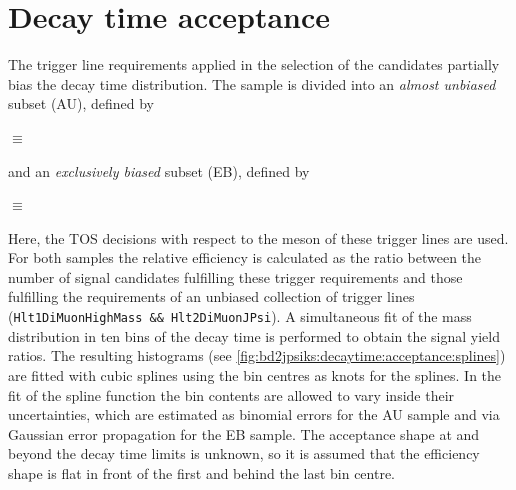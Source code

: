 \section{Decay time acceptance}
\label{sec:bd2jpsiks:decaytime:acceptance}

The trigger line requirements applied in the selection of the \BdToJPsiKS
candidates partially bias the decay time distribution. The sample is divided
into an \emph{almost unbiased} subset (AU), defined by
\begin{description}\small
  \item[AU] $\equiv$ 
\end{description}
and an \emph{exclusively biased} subset (EB), defined by
\begin{description}\small
  \item[EB] $\equiv$ 
\end{description}
Here, the TOS decisions with respect to the \JPsi meson of these trigger lines
are used. For both samples the relative efficiency is calculated as the ratio
between the number of signal candidates fulfilling these trigger requirements
and those fulfilling the requirements of an unbiased collection of trigger
lines (\texttt{Hlt1DiMuonHighMass \&\& Hlt2DiMuonJPsi}). A simultaneous fit of
the mass distribution in ten bins of the decay time is performed to obtain the
signal yield ratios. The resulting histograms (see
\cref{fig:bd2jpsiks:decaytime:acceptance:splines}) are fitted with cubic
splines using the bin centres as knots for the splines. In the fit of the
spline function the bin contents are allowed to vary inside their
uncertainties, which are estimated as binomial errors for the AU sample and
via Gaussian error propagation for the EB sample. The acceptance shape at and
beyond the decay time limits is unknown, so it is assumed that the efficiency
shape is flat in front of the first and behind the last bin centre.

